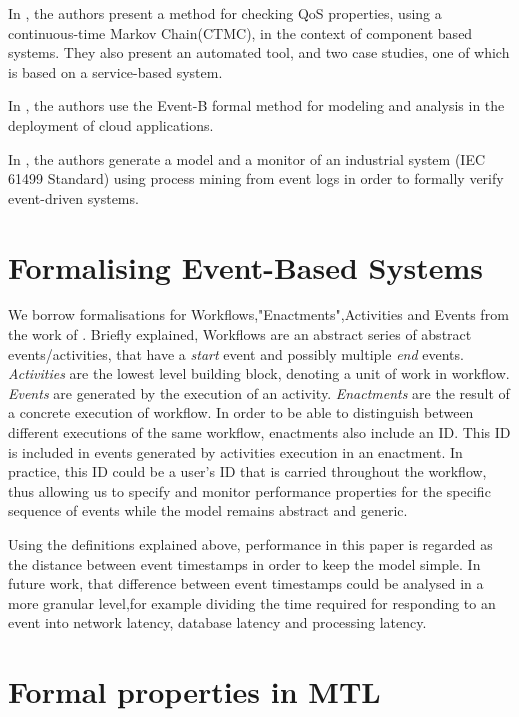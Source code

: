 \documentclass[twocolumn]{article}
\begin{document}
In \cite{paterson_observation-enhanced_2018}, the authors present a method for checking QoS properties, using a continuous-time Markov Chain(CTMC), in the context of component based systems. They also present an automated tool, and two case studies, one of which is based on a service-based system.

In \cite{mammar_formal_2024}, the authors use the Event-B formal method for modeling and analysis in the deployment of cloud applications.

In \cite{xavier_framework_2024}, the authors generate a model and a monitor of an industrial system ({IEC 61499 Standard}) using process mining from event logs in order to formally verify event-driven systems.


\section{Formalising Event-Based Systems}
We borrow formalisations for Workflows,"Enactments",Activities and Events from the work of \cite{mackey_early_2024}. Briefly explained, Workflows are an abstract series of abstract events/activities, that have a {\it start} event and possibly multiple {\it end} events.
\emph{Activities} are the lowest level building block, denoting a unit of work in workflow.
\emph{Events} are generated by the execution of an activity.
\emph{Enactments} are the result of a concrete execution of workflow. In order to be able to distinguish between different executions of the same workflow, enactments also include an ID.
This ID is included in events generated by activities execution in an enactment. In practice, this ID could be a user's ID that is carried throughout the workflow, thus allowing us to specify and monitor performance properties for the specific sequence of events while the model remains abstract and generic.

\par
Using the definitions explained above, performance in this paper is regarded as the distance between event timestamps
in order to keep the model simple.
In future work, that difference between event timestamps could be analysed in a more granular level,for example dividing the time required for responding to an event into network latency, database latency and processing latency.

\section{Formal properties in MTL}
\end{document}
